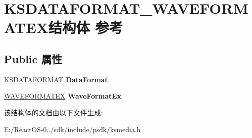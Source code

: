 \hypertarget{struct_k_s_d_a_t_a_f_o_r_m_a_t___w_a_v_e_f_o_r_m_a_t_e_x}{}\section{K\+S\+D\+A\+T\+A\+F\+O\+R\+M\+A\+T\+\_\+\+W\+A\+V\+E\+F\+O\+R\+M\+A\+T\+E\+X结构体 参考}
\label{struct_k_s_d_a_t_a_f_o_r_m_a_t___w_a_v_e_f_o_r_m_a_t_e_x}
\subsection*{Public 属性}
\begin{DoxyCompactItemize}
\item 
\mbox{\label{struct_k_s_d_a_t_a_f_o_r_m_a_t___w_a_v_e_f_o_r_m_a_t_e_x_a69031204ed6530669b25847fecf05fb9}} 
\hyperlink{struct_k_s_d_a_t_a_f_o_r_m_a_t}{K\+S\+D\+A\+T\+A\+F\+O\+R\+M\+AT} {\bfseries Data\+Format}
\item 
\mbox{\label{struct_k_s_d_a_t_a_f_o_r_m_a_t___w_a_v_e_f_o_r_m_a_t_e_x_a410b14a1fd171f3fd5a49d9f5c5f586c}} 
\hyperlink{struct_w_a_v_e_f_o_r_m_a_t_e_x}{W\+A\+V\+E\+F\+O\+R\+M\+A\+T\+EX} {\bfseries Wave\+Format\+Ex}
\end{DoxyCompactItemize}


该结构体的文档由以下文件生成\+:\begin{DoxyCompactItemize}
\item 
E\+:/\+React\+O\+S-\/0../sdk/include/psdk/ksmedia.\+h\end{DoxyCompactItemize}
